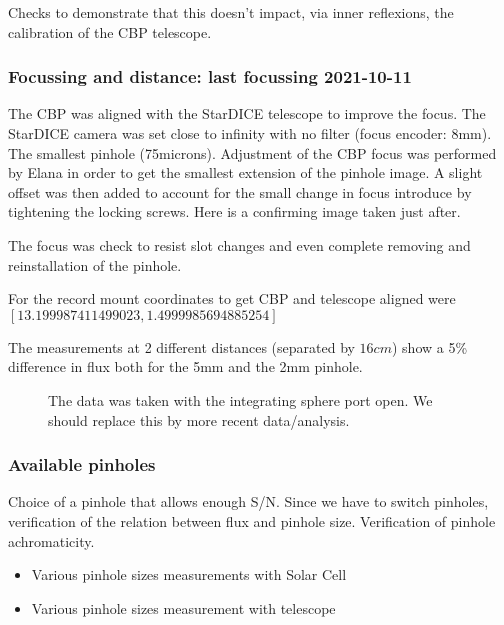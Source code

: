 \documentclass[onecolumn]{aa}
\begin{document}
Checks to demonstrate that this doesn't impact, via inner reflexions, the
calibration of the CBP telescope.

\subsubsection{Focussing and distance: last focussing 2021-10-11}
The CBP was aligned with the StarDICE telescope to improve the focus. The
StarDICE camera was set close to infinity with no filter (focus encoder:
8mm). The smallest pinhole (75microns). Adjustment of the CBP focus was
performed by Elana in order to get the smallest extension of the pinhole
image. A slight offset was then added to account for the small change in focus
introduce by tightening the locking screws. Here is a confirming image taken
just after.

The focus was check to resist slot changes and even complete removing and
reinstallation of the pinhole.

For the record mount coordinates to get CBP and telescope aligned were
$[13.199987411499023, 1.4999985694885254]$

The measurements at 2 different distances (separated by $16 cm$) show a 5\%
difference in flux both for the 5mm and the 2mm pinhole.

\begin{figure}[!ht]
\begin{center}
\end{center}
\caption[]{The data was taken with the integrating sphere port open. We should
  replace this by more recent data/analysis.}
\label{fig:distancevariation}
\end{figure}


\subsubsection{Available pinholes}

Choice of a pinhole that allows enough S/N. Since we have to switch pinholes,
verification of the relation between flux and pinhole size. Verification of
pinhole achromaticity.

\begin{itemize}
\item Various pinhole sizes measurements with Solar Cell
\item Various pinhole sizes measurement with telescope
\end{itemize}
\end{document}
